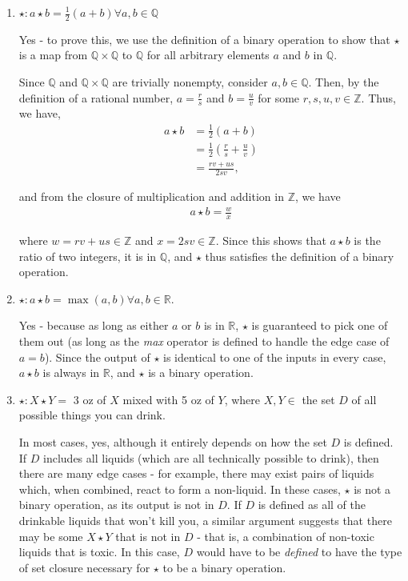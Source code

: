 \documentclass{scrartcl}
\begin{document}
\begin{enumerate}
\begin{enumerate}
			\item $\star : a\star b = \frac{1}{2}(a+b) \forall a,b \in \mathbb{Q}$
			
				Yes - to prove this, we use the definition of a binary operation to show that $\star$ is a map from $\mathbb{Q} \times \mathbb{Q}$ to $\mathbb{Q}$ for all arbitrary elements $a$ and $b$ in $\mathbb{Q}$.
				
				Since $\mathbb{Q}$ and $\mathbb{Q} \times \mathbb{Q}$ are trivially nonempty, consider $a,b \in \mathbb{Q}$. Then, by the definition of a rational number, $a = \frac{r}{s}$ and $b = \frac{u}{v}$ for some $r,s,u,v \in \mathbb{Z}$.
				Thus, we have,
				\begin{align*}
					a \star b &= \frac{1}{2}(a+b) \\
					&= \frac{1}{2}(\frac{r}{s} + \frac{u}{v}) \\
					&= \frac{rv + us}{2sv},
				\end{align*}
				
				and from the closure of multiplication and addition in $\mathbb{Z}$, we have
				\begin{align*}
					a\star b = \frac{w}{x}
				\end{align*}
				
				where $w = rv + us \in \mathbb{Z}$ and $x = 2sv \in \mathbb{Z}$. Since this shows that $a\star b$ is the ratio of two integers, it is in $\mathbb{Q}$, and $\star$ thus satisfies the definition of a binary operation.
				
			
			\item $\star : a\star b = \max(a,b) \forall a,b \in \mathbb{R}$.
			
				Yes - because as long as either $a$ or $b$ is in $\mathbb{R}$, $\star$ is guaranteed to pick one of them out (as long as the \textit{max} operator is defined to handle the edge case of $a=b$). Since the output of $\star$ is identical to one of the inputs in every case, $a\star b$ is always in $\mathbb{R}$, and $\star$ is a binary operation.
			
			\item $\star : X \star Y = $ 3 oz of $X$ mixed with 5 oz of $Y$, where $X, Y \in $ the set $D$ of all possible things you can drink.
			
				In most cases, yes, although it entirely depends on how the set $D$ is defined. If $D$ includes all liquids (which are all technically possible to drink), then there are many edge cases - for example, there may exist pairs of liquids which, when combined, react to form a non-liquid. In these cases, $\star$ is not a binary operation, as its output is not in $D$. If $D$ is defined as all of the drinkable liquids that won't kill you, a similar argument suggests that there may be some $X\star Y$ that is not in $D$ - that is, a combination of non-toxic liquids that is toxic. In this case, $D$ would have to be \textit{defined} to have the type of set closure necessary for $\star$ to be a binary operation.
			

\end{enumerate}
\end{enumerate}
\end{document}
